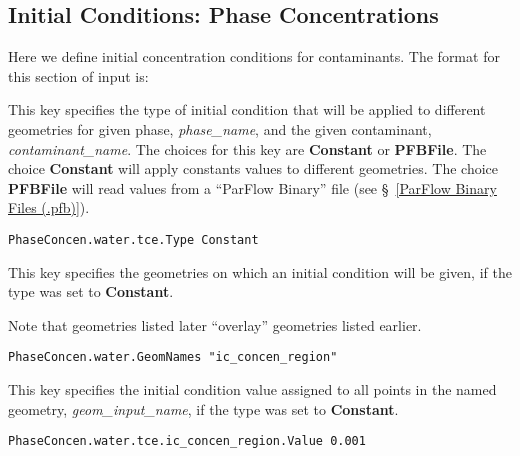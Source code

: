 
\subsection{Initial Conditions: Phase Concentrations}
\label{Initial Conditions: Phase Concentrations}

Here we define initial concentration conditions for contaminants.
The format for this section of input is:

{
This key specifies the type of initial condition that will be applied
to different geometries for given phase, {\em phase\_name}, and the
given contaminant, {\em contaminant\_name}.  The choices for this key
are {\bf Constant} or {\bf PFBFile}.  The choice {\bf Constant} will
apply constants values to different geometries.  The choice
{\bf PFBFile}  will read values from a ``ParFlow Binary'' file
(see \S~\ref{ParFlow Binary Files (.pfb)}).
}
\begin{display}\begin{verbatim}
PhaseConcen.water.tce.Type Constant
\end{verbatim}\end{display}

{
This key specifies the geometries on which an initial condition will be
given, if the type was set to {\bf Constant}.

Note that geometries listed later ``overlay'' geometries listed earlier.
}
\begin{display}\begin{verbatim}
PhaseConcen.water.GeomNames "ic_concen_region"
\end{verbatim}\end{display}

{
This key specifies the initial condition value assigned to all points in
the named geometry, {\em geom\_input\_name}, if the type was set to
{\bf Constant}.
}
\begin{display}\begin{verbatim}
PhaseConcen.water.tce.ic_concen_region.Value 0.001
\end{verbatim}\end{display}

